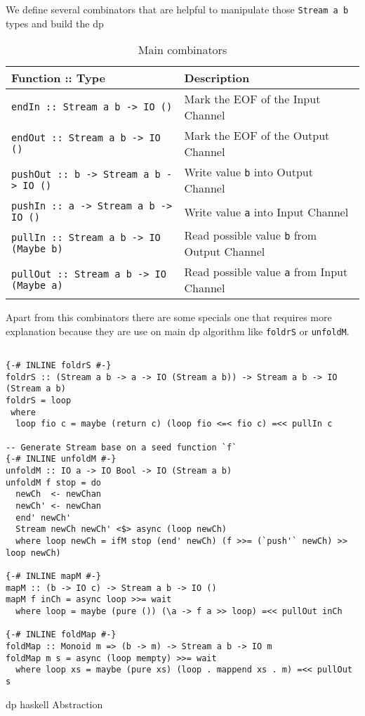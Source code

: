 \documentclass[preprint]{elsarticle}
\begin{document}
We define several combinators that are helpful to manipulate those \texttt{Stream a b} types and build the \acrshort{dp}

\begin{table}[H]
  \begin{tabular}{|l|l|}
   \hline
   Function :: Type & Description\\
   \hline
   \texttt{endIn :: Stream a b -> IO ()} & Mark the EOF of the Input Channel \\
   \hline
   \texttt{endOut :: Stream a b -> IO ()} & Mark the EOF of the Output Channel \\
   \hline
   \texttt{pushOut :: b -> Stream a b -> IO ()} & Write value \texttt{b} into Output Channel \\
   \hline
   \texttt{pushIn :: a -> Stream a b -> IO ()} & Write value \texttt{a} into Input Channel \\
   \hline
   \texttt{pullIn :: Stream a b -> IO (Maybe b)} & Read possible value \texttt{b} from Output Channel \\
   \hline
   \texttt{pullOut :: Stream a b -> IO (Maybe a)} & Read possible value \texttt{a} from Input Channel \\
   \hline
  \end{tabular}
 \caption{Main combinators}
 \label{table:1}
 \end{table}
 
Apart from this combinators there are some specials one that requires more explanation because they are use on main \acrshort{dp} algorithm
like \texttt{foldrS} or \texttt{unfoldM}.

\begin{listing}[H]
\begin{verbatim}    

{-# INLINE foldrS #-}
foldrS :: (Stream a b -> a -> IO (Stream a b)) -> Stream a b -> IO (Stream a b)
foldrS = loop
 where
  loop fio c = maybe (return c) (loop fio <=< fio c) =<< pullIn c

-- Generate Stream base on a seed function `f`
{-# INLINE unfoldM #-}
unfoldM :: IO a -> IO Bool -> IO (Stream a b)
unfoldM f stop = do
  newCh  <- newChan
  newCh' <- newChan
  end' newCh'
  Stream newCh newCh' <$> async (loop newCh)
  where loop newCh = ifM stop (end' newCh) (f >>= (`push'` newCh) >> loop newCh)

{-# INLINE mapM #-}
mapM :: (b -> IO c) -> Stream a b -> IO ()
mapM f inCh = async loop >>= wait
  where loop = maybe (pure ()) (\a -> f a >> loop) =<< pullOut inCh

{-# INLINE foldMap #-}
foldMap :: Monoid m => (b -> m) -> Stream a b -> IO m
foldMap m s = async (loop mempty) >>= wait
  where loop xs = maybe (pure xs) (loop . mappend xs . m) =<< pullOut s

\end{verbatim}
\caption{\acrshort{dp} \acrshort{haskell} Abstraction}
\label{src:haskell:5}
\end{listing}
\end{document}
